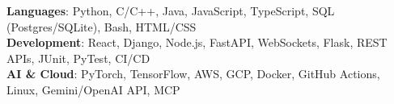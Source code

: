 \begin{itemize}[leftmargin=0.15in, label={}]
    \small{\item{
     \textbf{Languages}{: Python, C/C++, Java, JavaScript, TypeScript, SQL (Postgres/SQLite), Bash, HTML/CSS} \\
     \textbf{Development}{: React, Django, Node.js, FastAPI, WebSockets, Flask, REST APIs, JUnit, PyTest, CI/CD} \\
     \textbf{AI \& Cloud}{: PyTorch, TensorFlow, AWS, GCP, Docker, GitHub Actions, Linux, Gemini/OpenAI API, MCP}
    }}
\end{itemize}
